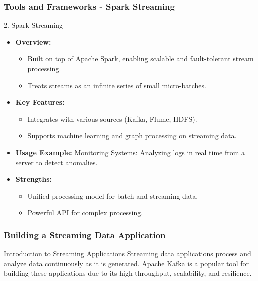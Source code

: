 \documentclass[aspectratio=169]{beamer}
\begin{document}
\begin{frame}[fragile]
    \frametitle{Tools and Frameworks - Spark Streaming}
    \begin{block}{2. Spark Streaming}
        \begin{itemize}
            \item \textbf{Overview:}
            \begin{itemize}
                \item Built on top of Apache Spark, enabling scalable and fault-tolerant stream processing.
                \item Treats streams as an infinite series of small micro-batches.
            \end{itemize}

            \item \textbf{Key Features:}
            \begin{itemize}
                \item Integrates with various sources (Kafka, Flume, HDFS).
                \item Supports machine learning and graph processing on streaming data.
            \end{itemize}

            \item \textbf{Usage Example:} 
            Monitoring Systems: Analyzing logs in real time from a server to detect anomalies.

            \item \textbf{Strengths:}
            \begin{itemize}
                \item Unified processing model for batch and streaming data.
                \item Powerful API for complex processing.
            \end{itemize}
        \end{itemize}
    \end{block}
\end{frame}

\begin{frame}
    \frametitle{Building a Streaming Data Application}
    \begin{block}{Introduction to Streaming Applications}
        Streaming data applications process and analyze data continuously as it is generated. Apache Kafka is a popular tool for building these applications due to its high throughput, scalability, and resilience.
    \end{block}
\end{frame}
\end{document}
